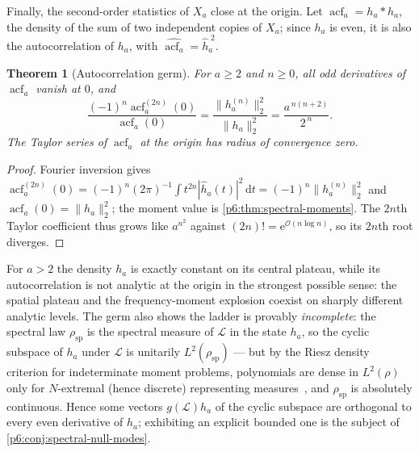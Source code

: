 \documentclass[11pt,oneside]{article}
\numberwithin{equation}{section}
\newtheorem{theorem}{Theorem}[section]
\theoremstyle{definition}
\theoremstyle{remark}
\newcommand{\dd}{\,\mathrm d}
\newcommand{\e}{\mathrm e}
\newcommand{\bigO}{\mathcal O}
\begin{document}
Finally, the second-order statistics of $X_a$ close at the origin.  Let
$\operatorname{acf}_a=h_a*h_a$, the density of the sum of two independent
copies of $X_a$; since $h_a$ is even, it is also the autocorrelation of
$h_a$, with $\widehat{\operatorname{acf}_a}=\widehat h_a^{\;2}$.

\begin{theorem}[Autocorrelation germ]\label{p6:thm:acf-germ}
For $a\ge2$ and $n\ge0$, all odd derivatives of $\operatorname{acf}_a$
vanish at $0$, and
\begin{equation}\label{p6:eq:acf-germ}
 \boxed{\ \frac{(-1)^n\operatorname{acf}_a^{(2n)}(0)}
 {\operatorname{acf}_a(0)}
 =\frac{\|h_a^{(n)}\|_2^2}{\|h_a\|_2^2}
 =\frac{a^{\,n(n+2)}}{2^{\,n}}.\ }
\end{equation}
The Taylor series of $\operatorname{acf}_a$ at the origin has radius of
convergence zero.
\end{theorem}

\begin{proof}
Fourier inversion gives
$\operatorname{acf}_a^{(2n)}(0)
=(-1)^n(2\pi)^{-1}\int t^{2n}|\widehat h_a(t)|^2\dd t
=(-1)^n\|h_a^{(n)}\|_2^2$ and $\operatorname{acf}_a(0)=\|h_a\|_2^2$; the
moment value is \cref{p6:thm:spectral-moments}.  The $2n$th Taylor
coefficient thus grows like $a^{n^2}$ against $(2n)!=\e^{\bigO(n\log n)}$,
so its $2n$th root diverges.
\end{proof}

\begin{remark}
For $a>2$ the density $h_a$ is exactly constant on its central plateau,
while its autocorrelation is not analytic at the origin in the strongest
possible sense: the spatial plateau and the frequency-moment explosion
coexist on sharply different analytic levels.  The germ also shows the
ladder is provably \emph{incomplete}: the spectral law
$\rho_{\mathrm{sp}}$ is the spectral measure of $\mathcal L$ in the state
$h_a$, so the cyclic subspace of $h_a$ under $\mathcal L$ is unitarily
$L^2(\rho_{\mathrm{sp}})$ --- but by the Riesz density criterion for
indeterminate moment problems, polynomials are dense in $L^2(\rho)$ only
for $N$-extremal (hence discrete) representing
measures~\cite{p6:ismail}, and $\rho_{\mathrm{sp}}$ is absolutely
continuous.  Hence some vectors $g(\mathcal L)h_a$ of the cyclic subspace
are orthogonal to every even derivative of $h_a$; exhibiting an explicit
bounded one is the subject of \cref{p6:conj:spectral-null-modes}.
\end{remark}
\end{document}
